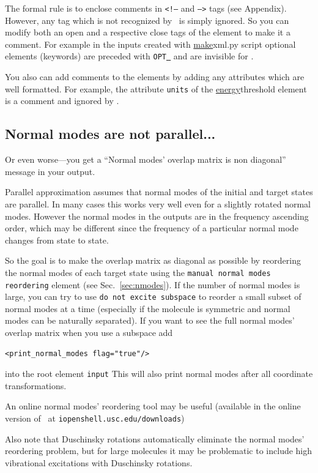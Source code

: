 \documentclass[11pt]{article}
\begin{document}
The formal rule is to enclose comments in {\tt <!--} and {\tt -->} tags (see Appendix).
However, any tag which is not recognized by \ezFCF\ is simply ignored.
So you can modify both an open and a respective close tags of the element to make it a comment.
For example in the inputs created with \ul{make}{xml.py} script optional elements (keywords)
are preceded with {\tt OPT\underline{~}} and are invisible for \ezFCF.

You also can add comments to the elements by adding any attributes which are well formatted. 
For example, the attribute {\tt units} of the \ul{energy}{threshold} element is
a comment and ignored by \ezFCF.


\subsection{Normal modes are not parallel...}
\label{sec:nonparallel}
Or even worse---you get a ``Normal modes' overlap matrix is non diagonal'' message in your output.

Parallel approximation assumes that normal modes of the initial and target states are parallel.
In many cases this works very well even for a slightly rotated normal modes. 
However the normal modes in the \ai outputs are in the frequency ascending order,
which may be different since the frequency of a particular normal mode changes from state to state. 

So the goal is to make the overlap matrix as diagonal as possible by reordering
the normal modes of each target state using the {\tt manual normal modes reordering} element
(see Sec.~\ref{sec:nmodes}). 
If the number of normal modes is large, you can try to use {\tt do not excite subspace}
to reorder a small subset of normal modes at a time
(especially if the molecule is symmetric and normal modes can be naturally separated).
If you want to see the full normal modes' overlap matrix when you use a subspace add
\begin{lstlisting}[frame=single,framerule=0pt]
<print_normal_modes flag="true"/>
\end{lstlisting}
into the root element {\tt input}
This will also print normal modes after all coordinate transformations.

An online normal modes' reordering tool may be useful (available in the online version of \ezFCF\
at {\tt iopenshell.usc.edu/downloads})

Also note that Duschinsky rotations automatically eliminate the normal modes' reordering problem, but for
large molecules it may be problematic to include high vibrational excitations with Duschinsky rotations.
\end{document}
